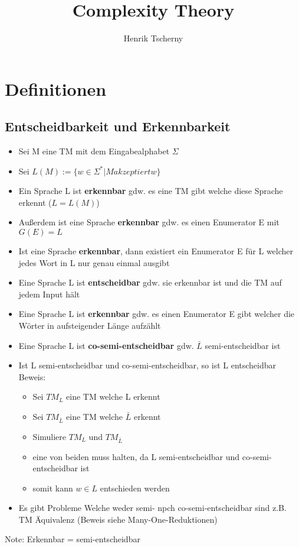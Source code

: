 \documentclass[12pt,a4paper]{article}
\title{Complexity Theory}
\author{Henrik Tscherny}
\begin{document}
\maketitle
\tableofcontents

\section{Definitionen}
\subsection{Entscheidbarkeit und Erkennbarkeit}
\begin{itemize}
\item Sei M eine TM mit dem Eingabealphabet $\Sigma$
\item Sei $L(M) := \{w \in \Sigma^* \vert M akzeptiert w\}$
\item Ein Sprache L ist \textbf{erkennbar} gdw. es eine TM gibt welche diese Sprache erkennt ($L = L(M)$)
\item Außerdem ist eine Sprache \textbf{erkennbar} gdw. es einen Enumerator E mit $G(E) = L$
\item Ist eine Sprache \textbf{erkennbar}, dann existiert ein Enumerator E für L welcher jedes Wort in L nur genau einmal ausgibt
\item Eine Sprache L ist \textbf{entscheidbar} gdw. sie erkennbar ist und die TM auf jedem Input hält
\item Eine Sprache L ist \textbf{erkennbar} gdw. es einen Enumerator E gibt welcher die Wörter in aufsteigender Länge aufzählt
\item Eine Sprache L ist \textbf{co-semi-entscheidbar} gdw. $\bar{L}$ semi-entscheidbar ist
\item Ist L semi-entscheidbar und co-semi-entscheidbar, so ist L entscheidbar\\
Beweis:
\begin{itemize}
\item Sei $TM_L$ eine TM welche L erkennt
\item Sei $TM_{\bar{L}}$ eine TM welche $\bar{L}$ erkennt
\item Simuliere $TM_L$ und $TM_{\bar{L}}$
\item eine von beiden muss halten, da L semi-entscheidbar und co-semi-entscheidbar ist
\item somit kann $w \in L$ entschieden werden
\end{itemize}
\item Es gibt Probleme Welche weder semi- npch co-semi-entscheidbar sind z.B. TM Äquivalenz (Beweis siehe Many-One-Reduktionen)
\end{itemize}
Note: Erkennbar = semi-entscheidbar
\end{document}
